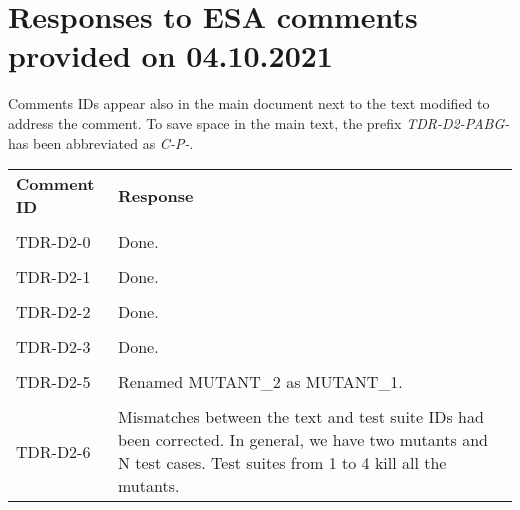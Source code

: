 
\section{Responses to ESA comments provided on 04.10.2021}
\label{sec:ESA:comments:1}

Comments IDs appear also in the main document next to the text modified to address the comment. To save space in the main text, the prefix \emph{TDR-D2-PABG-} has been abbreviated as \emph{C-P-}.

\setlength\LTleft{0pt}
\setlength\LTright{0pt}
\tiny 
\begin{longtable}{|p{1.5cm}|p{12cm}|@{}}
\textbf{Comment ID}&\textbf{Response}\\
\\
\hline
TDR-D2-0&
\begin{minipage}{12cm}
Done.
\end{minipage}\\
\\
\hline

TDR-D2-1&
\begin{minipage}{12cm}
Done.
\end{minipage}\\
\\
\hline

TDR-D2-2&
\begin{minipage}{12cm}
Done.
\end{minipage}\\
\\
\hline


TDR-D2-3&
\begin{minipage}{12cm}
Done.
\end{minipage}\\
\\
\hline

TDR-D2-5&
\begin{minipage}{12cm}
Renamed MUTANT\_2 as MUTANT\_1.

\end{minipage}\\
\\
\hline

TDR-D2-6&
\begin{minipage}{12cm}
Mismatches between the text and test suite IDs had been corrected.
In general, we have two mutants and N test cases. Test suites from 1 to 4 kill all the mutants.


\end{minipage}
\end{longtable}
